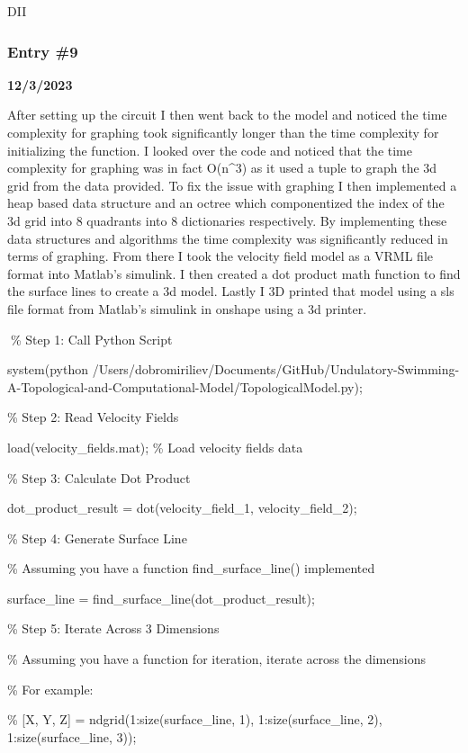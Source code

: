 DII

\subsubsection{Entry \#9}\label{entry-9}

\textbf{12/3/2023}

After setting up the circuit I then went back to the model and noticed
the time complexity for graphing took significantly longer than the time
complexity for initializing the function. I looked over the code and
noticed that the time complexity for graphing was in fact O(n\^{}3) as
it used a tuple to graph the 3d grid from the data provided. To fix the
issue with graphing I then implemented a heap based data structure and
an octree which componentized the index of the 3d grid into 8 quadrants
into 8 dictionaries respectively. By implementing these data structures
and algorithms the time complexity was significantly reduced in terms of
graphing. From there I took the velocity field model as a VRML file
format into Matlab's simulink. I then created a dot product math
function to find the surface lines to create a 3d model. Lastly I 3D
printed that model using a sls file format from Matlab's simulink in
onshape using a 3d printer.

\% Step 1: Call Python Script

system(\textquotesingle python
/Users/dobromiriliev/Documents/GitHub/Undulatory-Swimming-A-Topological-and-Computational-Model/TopologicalModel.py\textquotesingle);

\% Step 2: Read Velocity Fields

load(\textquotesingle velocity\_fields.mat\textquotesingle); \% Load
velocity fields data

\% Step 3: Calculate Dot Product

dot\_product\_result = dot(velocity\_field\_1, velocity\_field\_2);

\% Step 4: Generate Surface Line

\% Assuming you have a function find\_surface\_line() implemented

surface\_line = find\_surface\_line(dot\_product\_result);

\% Step 5: Iterate Across 3 Dimensions

\% Assuming you have a function for iteration, iterate across the
dimensions

\% For example:

\% {[}X, Y, Z{]} = ndgrid(1:size(surface\_line, 1),
1:size(surface\_line, 2), 1:size(surface\_line, 3));

